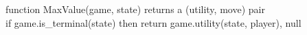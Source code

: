 \documentclass[preview]{standalone}
\begin{document}
\begin{center}
function MaxValue(game, state) returns a (utility, move) pair\\if game.is\_terminal(state) then return game.utility(state, player), null
\end{center}
\end{document}
